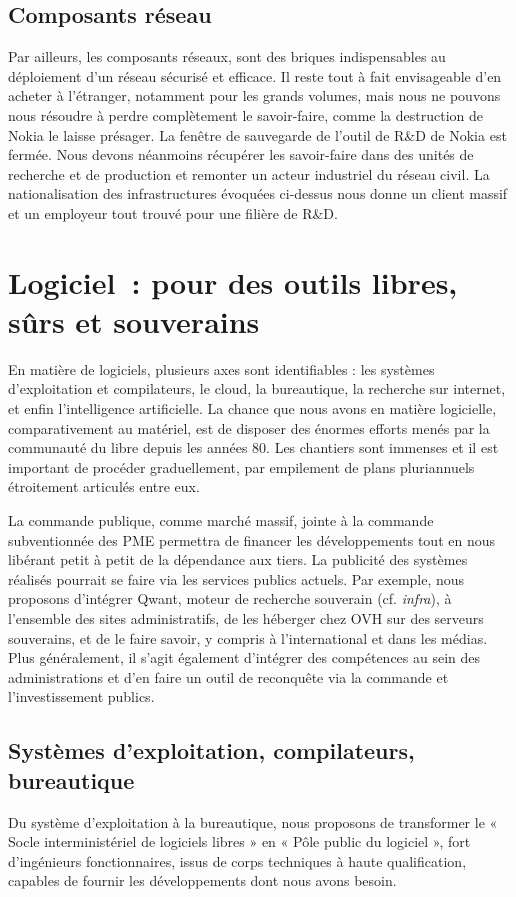 \documentclass[a4paper]{article}
\begin{document}
\subsection{Composants réseau}
Par ailleurs, les composants réseaux, sont des briques indispensables au déploiement d’un réseau sécurisé et efficace. Il reste tout à fait envisageable d’en acheter à l’étranger, notamment pour les grands volumes, mais nous ne pouvons nous résoudre à perdre complètement le savoir-faire, comme la destruction de Nokia le laisse présager. La fenêtre de sauvegarde de l’outil de R\&D de Nokia est fermée. Nous devons néanmoins récupérer les savoir-faire dans des unités de recherche et de production et remonter un acteur industriel du réseau civil. La nationalisation des infrastructures évoquées ci-dessus nous donne un client massif et un employeur tout trouvé pour une filière de R\&D. 

\section{Logiciel~: pour des outils libres, sûrs et souverains}
En matière de logiciels, plusieurs axes sont identifiables : les systèmes d’exploitation et compilateurs, le cloud, la bureautique, la recherche sur internet, et enfin l’intelligence artificielle. La chance que nous avons en matière logicielle, comparativement au matériel, est de disposer des énormes efforts menés par la communauté du libre depuis les années 80. Les chantiers sont immenses et il est important de procéder graduellement, par empilement de plans pluriannuels étroitement articulés entre eux.
 
La commande publique, comme marché massif, jointe à la commande subventionnée des PME permettra de financer les développements tout en nous libérant petit à petit de la dépendance aux tiers. La publicité des systèmes réalisés pourrait se faire via les services publics actuels. Par exemple, nous proposons d’intégrer Qwant, moteur de recherche souverain (cf. \textit{infra}), à l’ensemble des sites administratifs, de les héberger chez OVH sur des serveurs souverains, et de le faire savoir, y compris à l’international et dans les médias. 
Plus généralement, il s’agit également d’intégrer des compétences au sein des administrations et d’en faire un outil de reconquête via la commande et l’investissement publics. 

\subsection{Systèmes d'exploitation, compilateurs, bureautique}
Du système d’exploitation à la bureautique, nous proposons de transformer le « Socle interministériel de logiciels libres » en « Pôle public du logiciel », fort d’ingénieurs fonctionnaires, issus de corps techniques à haute qualification, capables de fournir les développements dont nous avons besoin. 
\end{document}
